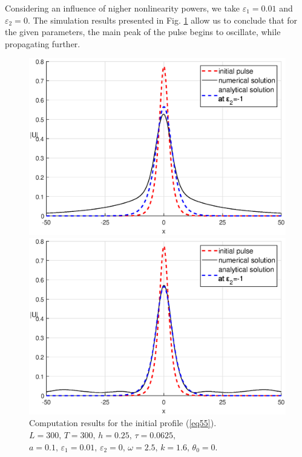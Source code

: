 \documentclass[preprint,12pt]{elsarticle}
\begin{document}
Considering an influence of nigher nonlinearity powers, we take \(\varepsilon_{1} = 0.01\) and \(\varepsilon_{2}=0\). The simulation results presented in Fig. \ref{fig21_1} allow us to conclude that for the given parameters, the main peak of the pulse begins to oscillate, while propagating further. 
\begin{figure}[H] %
\begin{center}
\begin{minipage}[h]{0.48\linewidth}
\includegraphics[width=1\linewidth]{fig33.eps}
\end{minipage}
\hfill
\begin{minipage}[h]{0.48\linewidth}
\includegraphics[width=1\linewidth]{fig34.eps}
\end{minipage}
\end{center}
\caption{Computation results for the initial profile (\ref{eq55}).\\ 
\(L=300,\, T=300,\, h=0.25,\, \tau=0.0625,\)\\
\(a=0.1,\,\varepsilon_{1}=0.01,\,\varepsilon_{2}=0,\, \omega=2.5,\, k=1.6,\, \theta_{0}=0\).}
\label{fig21_1}
\end{figure}
\end{document}
